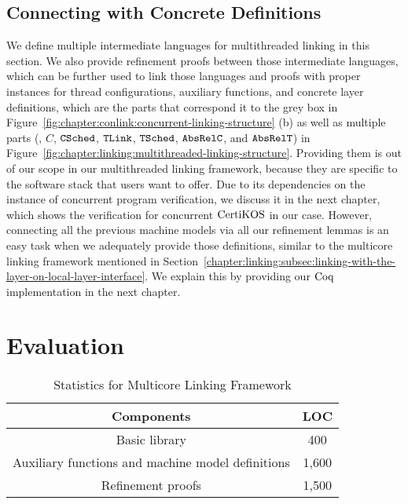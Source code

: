 \subsection{Connecting with Concrete Definitions}
\label{chapter:linking:subsec:connecting-with-thread-local-machine-model}

We define multiple intermediate languages for multithreaded linking in this section.
We  also provide  refinement proofs between those intermediate languages, which can be further used to link those languages and proofs  
with proper instances for thread configurations, auxiliary functions, and
concrete layer definitions,
which are the parts that correspond it to the grey box in Figure~\ref{fig:chapter:conlink:concurrent-linking-structure} (b) as well as 
multiple parts (\ie, $C$, ${{\mathrm{\texttt{CSched}}}}$, ${{\mathrm{\texttt{TLink}}}}$, ${{\mathrm{\texttt{TSched}}}}$, ${{\mathrm{\texttt{AbsRelC}}}}$, and ${{\mathrm{\texttt{AbsRelT}}}}$)
in Figure~\ref{fig:chapter:linking:multithreaded-linking-structure}. 
Providing them is out of our scope in our multithreaded linking framework,
because they are specific to the software stack that users want to offer. 
Due to its dependencies on the instance of concurrent program verification, 
we discuss it in the next chapter, which shows the verification for concurrent $\mathrm{CertiKOS}$ in our case. 
However, connecting all the previous machine models via
all our refinement lemmas is an
easy task when we adequately provide those definitions, similar to the multicore linking framework mentioned in Section~\ref{chapter:linking:subsec:linking-with-the-layer-on-local-layer-interface}.
We explain this by providing our $\mathrm{Coq}$ implementation in the next chapter.




\section{Evaluation}

\begin{table}
\begin{center}
\renewcommand{\arraystretch}{1.1}
\setlength{\tabcolsep}{0.3em}
\begin{tabular}{|c|c|}
\hline
Components  & LOC\\
\hline
\hline
Basic library & 400 \\
\hline
Auxiliary functions and machine model definitions & 1,600 \\
\hline
Refinement proofs & 1,500 \\
\hline
\end{tabular}
\end{center}
\caption{Statistics for Multicore Linking Framework}
\label{table:multicore-linking-evaluation}
\hrulefill
\end{table}

